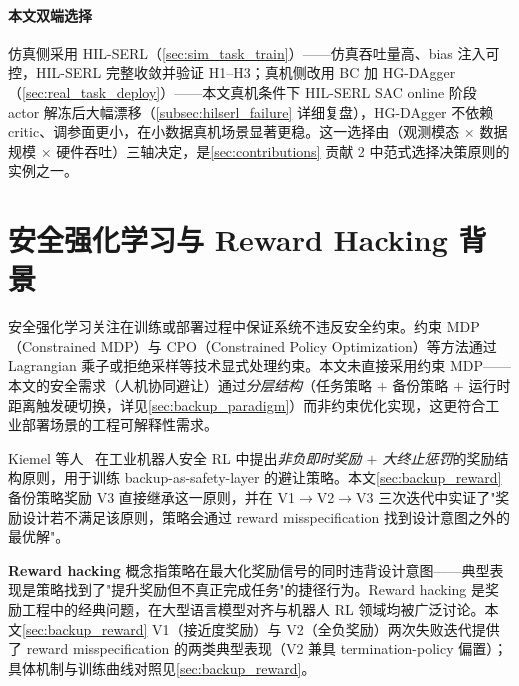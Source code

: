 \paragraph{本文双端选择}仿真侧采用 HIL-SERL（\cref{sec:sim_task_train}）——仿真吞吐量高、bias 注入可控，HIL-SERL 完整收敛并验证 H1–H3；真机侧改用 BC 加 HG-DAgger（\cref{sec:real_task_deploy}）——本文真机条件下 HIL-SERL SAC online 阶段 actor 解冻后大幅漂移（\cref{subsec:hilserl_failure} 详细复盘），HG-DAgger 不依赖 critic、调参面更小，在小数据真机场景显著更稳。这一选择由（观测模态 $\times$ 数据规模 $\times$ 硬件吞吐）三轴决定，是\cref{sec:contributions} 贡献 2 中范式选择决策原则的实例之一。

\section{安全强化学习与 Reward Hacking 背景}\label{sec:safe_rl}

安全强化学习关注在训练或部署过程中保证系统不违反安全约束。约束 MDP（Constrained MDP）与 CPO（Constrained Policy Optimization）等方法通过 Lagrangian 乘子或拒绝采样等技术显式处理约束。本文未直接采用约束 MDP——本文的安全需求（人机协同避让）通过\emph{分层结构}（任务策略 $+$ 备份策略 $+$ 运行时距离触发硬切换，详见\cref{sec:backup_paradigm}）而非约束优化实现，这更符合工业部署场景的工程可解释性需求。

Kiemel 等人~\cite{kiemel2024safe} 在工业机器人安全 RL 中提出\emph{非负即时奖励 $+$ 大终止惩罚}的奖励结构原则，用于训练 backup-as-safety-layer 的避让策略。本文\cref{sec:backup_reward} 备份策略奖励 V3 直接继承这一原则，并在 V1$\to$V2$\to$V3 三次迭代中实证了"奖励设计若不满足该原则，策略会通过 reward misspecification 找到设计意图之外的最优解"。

\textbf{Reward hacking} 概念指策略在最大化奖励信号的同时违背设计意图——典型表现是策略找到了"提升奖励但不真正完成任务"的捷径行为。Reward hacking 是奖励工程中的经典问题，在大型语言模型对齐与机器人 RL 领域均被广泛讨论。本文\cref{sec:backup_reward} V1（接近度奖励）与 V2（全负奖励）两次失败迭代提供了 reward misspecification 的两类典型表现（V2 兼具 termination-policy 偏置）；具体机制与训练曲线对照见\cref{sec:backup_reward}。
